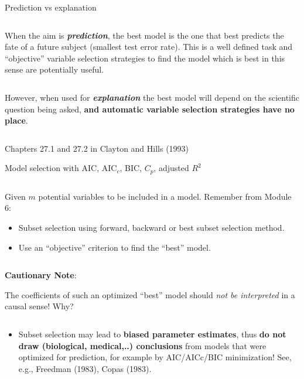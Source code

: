 \documentclass[10pt,ignorenonframetext,]{beamer}
\providecommand{\tightlist}{%
  \setlength{\itemsep}{0pt}\setlength{\parskip}{0pt}}
\begin{document}
\begin{frame}

\begin{block}{Prediction vs explanation}

\(~\)

When the aim is \textbf{\emph{prediction}}, the best model is the one
that best predicts the fate of a future subject (smallest test error
rate). This is a well defined task and ``objective'' variable selection
strategies to find the model which is best in this sense are potentially
useful.

\(~\)

However, when used for \textbf{\emph{explanation}} the best model will
depend on the scientific question being asked, \textbf{and automatic
variable selection strategies have no place}.

\(~\)

\scriptsize

Chapters 27.1 and 27.2 in Clayton and Hills (1993)

\end{block}

\end{frame}

\begin{frame}

\begin{block}{Model selection with AIC, AIC\(_c\), BIC, \(C_p\),
adjusted \(R^2\)}

\(~\)

Given \(m\) potential variables to be included in a model. Remember from
Module 6: \vspace{2mm}

\begin{itemize}
\item
  Subset selection using forward, backward or best subset selection
  method.
\item
  Use an ``objective'' criterion to find the ``best'' model.
\end{itemize}

\(~\)

\textbf{Cautionary Note}:

The coefficients of such an optimized ``best'' model should \emph{not be
interpreted} in a causal sense! Why?

\(~\)

\begin{itemize}
\tightlist
\item
  Subset selection may lead to \textbf{biased parameter estimates}, thus
  \textbf{do not draw (biological, medical,..) conclusions} from models
  that were optimized for prediction, for example by AIC/AICc/BIC
  minimization! See, e.g., Freedman (1983), Copas (1983).
\end{itemize}

\vspace{2mm}
\normalsize

\end{block}

\end{frame}
\end{document}
